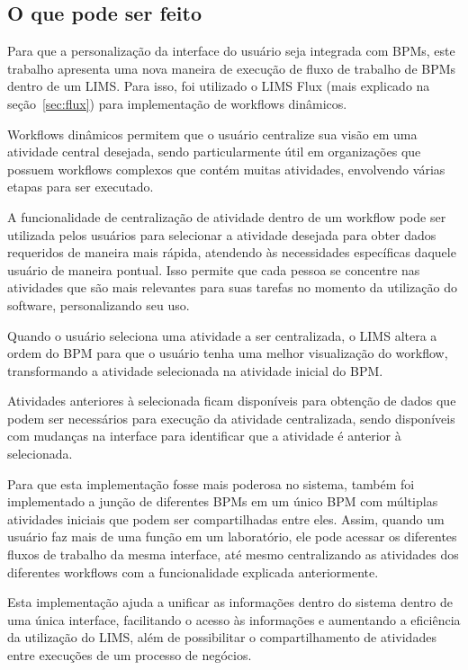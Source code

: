 \subsection{O que pode ser feito}


Para que a personalização da interface do usuário seja integrada com BPMs, este trabalho apresenta uma nova maneira de execução de fluxo de trabalho de BPMs dentro de um LIMS. Para isso, foi utilizado o LIMS Flux (mais explicado na seção~\ref{sec:flux}) para implementação de workflows dinâmicos.

Workflows dinâmicos permitem que o usuário centralize sua visão em uma atividade central desejada, sendo particularmente útil em organizações que possuem workflows complexos que contém muitas atividades, envolvendo várias etapas para ser executado.


A funcionalidade de centralização de atividade dentro de um workflow pode ser utilizada pelos usuários para selecionar a atividade desejada para obter dados requeridos de maneira mais rápida, atendendo às necessidades específicas daquele usuário de maneira pontual. Isso permite que cada pessoa se concentre nas atividades que são mais relevantes para suas tarefas no momento da utilização do software, personalizando seu uso.

Quando o usuário seleciona uma atividade a ser centralizada, o LIMS altera a ordem do BPM para que o usuário tenha uma melhor visualização do workflow, transformando a atividade selecionada na atividade inicial do BPM.

Atividades anteriores à selecionada ficam disponíveis para obtenção de dados que podem ser necessários para execução da atividade centralizada, sendo disponíveis com mudanças na interface para identificar que a atividade é anterior à selecionada.


Para que esta implementação fosse mais poderosa no sistema, também foi implementado a junção de diferentes BPMs em um único BPM com múltiplas atividades iniciais que podem ser compartilhadas entre eles. Assim, quando um usuário faz mais de uma função em um laboratório, ele pode acessar os diferentes fluxos de trabalho da mesma interface, até mesmo centralizando as atividades dos diferentes workflows com a funcionalidade explicada anteriormente.

Esta implementação ajuda a unificar as informações dentro do sistema dentro de uma única interface, facilitando o acesso às informações e aumentando a eficiência da utilização do LIMS, além de possibilitar o compartilhamento de atividades entre execuções de um processo de negócios.



